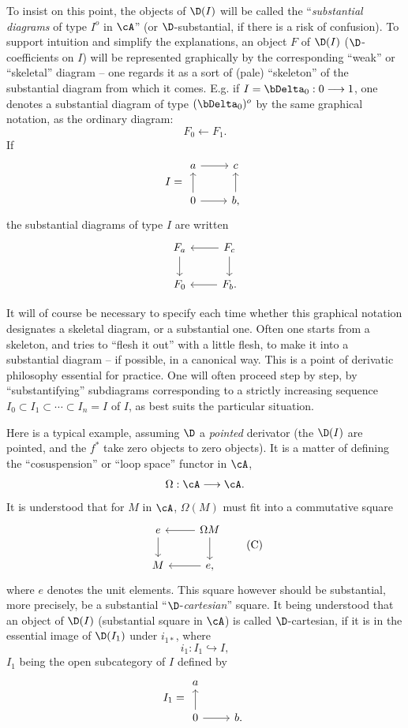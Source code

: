 To insist on this point, the objects of $\D(I)$ will be called the ``\textit{substantial diagrams} of type $I^o$ in $\cA$'' (or $\D$-substantial, if there is a risk of confusion). To support intuition and simplify the explanations, an object $F$ of $\D(I)$ ($\D$-coefficients on $I$) will be represented graphically by the corresponding ``weak'' or ``skeletal'' diagram -- one regards it
as a sort of (pale) ``skeleton'' of the substantial diagram from which it comes. E.g. if $I=\bDelta_0 : 0\longrightarrow 1$, one denotes a substantial diagram of type $(\bDelta_0)^o$ by the same graphical notation, as the ordinary diagram:
\[
F_0 \longleftarrow F_1.
\]
If
\[
I = \begin{tikzcd}
a \arrow[r] & c \\
0 \arrow[u] \arrow[r] & b, \arrow[u]
\end{tikzcd}
\]
the substantial diagrams of type $I$ are written
\[
\begin{tikzcd}
F_a \arrow[d] & F_c \arrow[l] \arrow[d] \\
F_0 & F_b. \arrow[l]
\end{tikzcd}
\]

\clearpage


It will of course be necessary to specify each time whether this graphical notation designates a skeletal diagram, or a substantial one. Often one starts from a skeleton, and tries to ``flesh it out'' with a little flesh, to make it into a substantial diagram -- if possible, in a canonical way. This is a point of derivatic philosophy essential for practice. One will often proceed step by step, by ``substantifying'' subdiagrams corresponding to a strictly increasing sequence $I_0\subset I_1\subset\cdots\subset I_n=I$ of $I$, as best suits the particular situation.


Here is a typical example, assuming $\D$ a \textit{pointed} derivator (the $\D(I)$ are pointed, and the $f^*$ take zero objects to zero objects). It is a matter of defining the ``cosuspension'' or ``loop space'' functor in $\cA$,
\[
\Omega : \cA \longrightarrow \cA.
\]
It is understood that for $M$ in $\cA$, $\Omega(M)$ must fit into a commutative square
\[
\begin{tikzcd}
e \arrow[d] & \Omega M \arrow[l] \arrow[d] \\
M & e, \arrow[l]
\end{tikzcd}
\tag*{(C)}
\]
where $e$ denotes the unit elements. This square however should be substantial, more precisely, be a substantial ``$\D$-\textit{cartesian}'' square. It being understood that an object of $\D(I)$ (substantial square in $\cA$) is called $\D$-cartesian, if it is in the essential image of $\D(I_1)$ under $i_{1*}$, where
\[
i_1 : I_1 \hookrightarrow I,
\]
$I_1$ being the open subcategory of $I$ defined by
\[
I_1 = \begin{tikzcd}
a \\
0 \arrow[u] \arrow[r] & b.
\end{tikzcd}
\]

